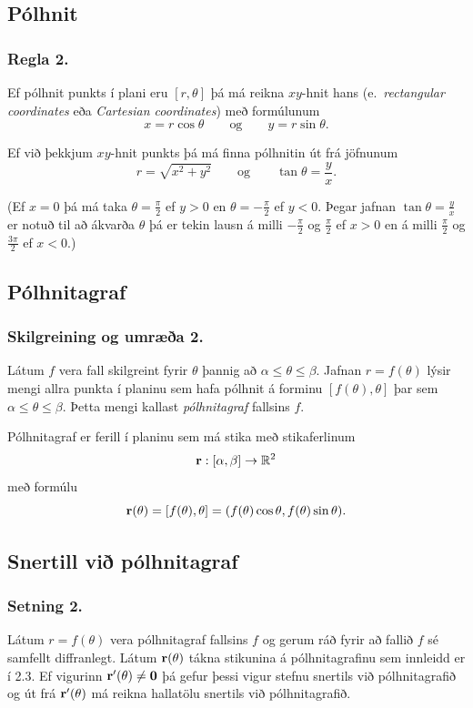 \subsection{Pólhnit}
\subsubsection{Regla 2.}
  Ef pólhnit punkts í plani eru $[r, \theta]$ þá má reikna $xy$-hnit hans (e.~{\em rectangular coordinates} eða {\em Cartesian coordinates}) með formúlunum
$$x=r\cos\theta \qquad\mbox{og}\qquad y=r\sin\theta.$$

Ef við þekkjum $xy$-hnit punkts þá má finna pólhnitin út frá jöfnunum
$$r=\sqrt{x^2+y^2}\qquad\mbox{og}
\qquad \tan\theta=\frac{y}{x}.$$

(Ef $x=0$ þá má taka $\theta=\frac{\pi}{2}$ ef $y>0$ en 
$\theta=-\frac{\pi}{2}$ ef $y<0$.  Þegar jafnan $\tan\theta=\frac{y}{x}$ er notuð til að ákvarða $\theta$ þá er tekin lausn á milli $-\frac{\pi}{2}$  og $\frac{\pi}{2}$ ef $x>0$ en á milli $\frac{\pi}{2}$ og $\frac{3\pi}{2}$ ef $x<0$.)



\subsection{Pólhnitagraf}
\subsubsection {Skilgreining og umræða 2. }Látum $f$ vera fall skilgreint fyrir 
$\theta$ þannig að 
$\alpha\leq\theta\leq\beta$.  Jafnan $r=f(\theta)$ lýsir mengi allra punkta í planinu sem hafa pólhnit á forminu $[f(\theta),\theta]$ þar sem $\alpha\leq\theta\leq\beta$.  Þetta mengi kallast {\em pólhnitagraf} fallsins $f$.

Pólhnitagraf er ferill í planinu sem má stika með stikaferlinum 
$$\mbox{${\bf r}$}:[\alpha,\beta]\rightarrow{\mathbb R}^2$$
með formúlu
$$\mbox{${\bf r}$}(\theta)=[f(\theta),\theta]=
(f(\theta)\cos\theta, f(\theta)\sin\theta).$$
 


\subsection{Snertill við pólhnitagraf}
 \subsubsection{Setning 2.}
  Látum $r=f(\theta)$ vera pólhnitagraf fallsins $f$ og gerum ráð fyrir að fallið $f$ sé samfellt diffranlegt.  Látum $\mbox{${\bf r}$}(\theta)$ tákna stikunina á pólhnitagrafinu sem innleidd er í 2.3.  Ef vigurinn 
$\mbox{${\bf r}$}'(\theta)\neq \mbox{${\bf 0}$}$ þá gefur þessi vigur stefnu snertils við pólhnitagrafið og út frá $\mbox{${\bf r}$}'(\theta)$ má reikna hallatölu snertils við pólhnitagrafið.
 



